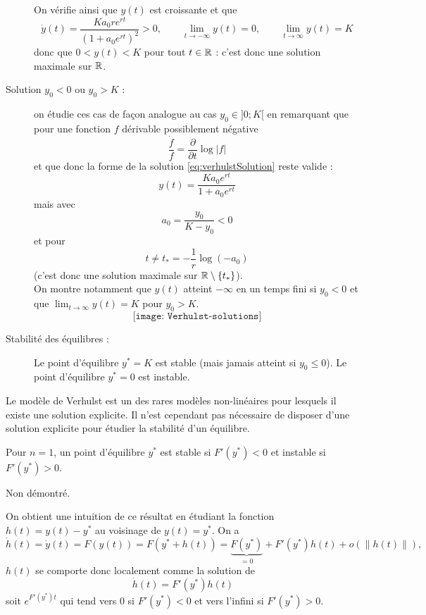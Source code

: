 \begin{description}
$$  $$
  On vérifie ainsi que $y(t)$ est croissante et que 
  $$
  \dot y(t) = \frac{Ka_0 r e^{rt}}{(1 + a_0 e^{rt})^2} > 0, 
  \qquad 
  \lim_{t \rightarrow -\infty} y(t) = 0, 
  \qquad
  \lim_{t \rightarrow \infty} y(t) = K
  $$
  donc que $0 < y(t) < K$ pour tout $t \in \mathbb{R}$ : c'est donc une solution maximale sur $\mathbb{R}$. \\
  \item[Solution $y_0 < 0$ ou $y_0 > K$ :] on étudie ces cas de façon analogue au cas $y_0 \in ]0; K[$ en remarquant que pour une fonction $f$ dérivable possiblement négative 
  $$
  \frac{\dot f}{f} = \frac{\partial}{\partial t} \log |f|
  $$
  et que donc la forme de la solution \eqref{eq:verhulstSolution} reste valide : 
  $$
  y(t) = \frac{K a_ 0 e^{rt}}{1 +  a_0 e^{rt}}
  $$
  mais avec
  $$
  a_0 = \frac{y_0}{K-y_0} < 0
  $$ 
  et pour 
  $$
  t \neq t_* = -\frac1r \log(-a_0)
  $$
  (c'est donc une solution maximale sur $\mathbb{R} \setminus \left\{t_*\right\}$). \\
  On montre notamment que $y(t)$ atteint $- \infty$ en un temps fini si $y_0 < 0$ et que $\lim_{t \rightarrow \infty} y(t) = K$ pour $y_0 > K$.
  $$
  \texttt{[image: Verhulst-solutions]}
  $$
  \item[Stabilité des équilibres :]
  Le point d'équilibre $y^* = K$ est stable (mais jamais atteint si $y_0 \leq 0$). Le point d'équilibre $y^* = 0$ est instable.
\end{description}

\remark
Le modèle de Verhulst est un des rares modèles non-linéaires pour lesquels il existe une solution explicite. Il n'est cependant pas nécessaire de disposer d'une solution explicite pour étudier la stabilité d'un équilibre.

\begin{theorem}[Stabilité ($n = 1$)]
  Pour $n=1$, un point d'équilibre $y^*$ est stable si $F'(y^*) < 0$ et instable si $F'(y^*) > 0$.
\end{theorem}

\proof Non démontré. \eproof

\remark
On obtient une intuition de ce résultat en étudiant la fonction $h(t) = y(t) - y^*$ au voisinage de $y(t) = y^*$. On a
$$
\dot h(t) = \dot y(t) = F(y(t)) = F(y^* + h(t)) = \underset{=0}{\underbrace{F(y^*)}} + F'(y^*) h(t) + o(\|h(t)\|),
$$
$h(t)$ se comporte donc localement comme la solution de 
$$
\dot h(t) = F'(y^*) h(t)
$$
soit $e ^{F'(y^*) t}$ qui tend vers 0 si $F'(y^*) < 0$ et vers l'infini si $F'(y^*) > 0$.

